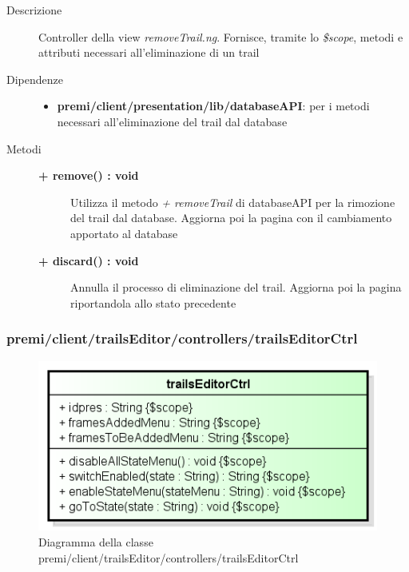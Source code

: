 \begin{description}
\item[Descrizione] \hfill
	Controller della view \textit{removeTrail.ng}. Fornisce, tramite lo \textit{\$scope}, metodi e attributi necessari all'eliminazione di un trail
	
	
\item[Dipendenze] \hfill
	\begin{itemize}
		\item \textbf{premi/client/presentation/lib/databaseAPI}: per i metodi necessari all'eliminazione del trail dal database
	\end{itemize}
	
	
\item[Metodi] \hfill

	\begin{description}
		\item[\textbf{\color{blue}+ remove() : void			}] \hfill
			Utilizza il metodo \textit{+ removeTrail} di databaseAPI per la rimozione del trail dal database. Aggiorna poi la pagina con il cambiamento apportato al database
	\end{description}
	
	\begin{description}
		\item[\textbf{\color{blue}+ discard() : void			}] \hfill
			Annulla il processo di eliminazione del trail. Aggiorna poi la pagina riportandola allo stato precedente
	\end{description}

\end{description}
	







\subsubsection{premi/client/trailsEditor/controllers/trailsEditorCtrl}
\begin{figure}[H]
\begin{center}
\includegraphics[scale=0.85]{img/diacla/trailsEditorCtrl.png}
\caption{Diagramma della classe premi/client/trailsEditor/controllers/trailsEditorCtrl}
\end{center}
\end{figure}


